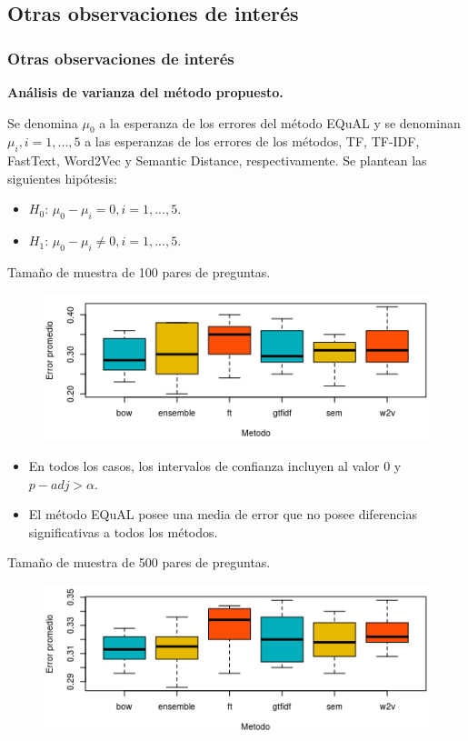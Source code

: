 \subsection{Otras observaciones de interés}
\begin{frame}
	\frametitle{Otras observaciones de interés}
	\textbf{Análisis de varianza del método propuesto.}

	Se denomina \(\mu_0\) a la esperanza de los errores del método EQuAL y se denominan \(\mu_i, i = 1,..., 5\) a las esperanzas de los errores de los métodos, TF, TF-IDF, FastText, Word2Vec y Semantic Distance, respectivamente. Se plantean las siguientes hipótesis:
	\bigskip
	\begin{itemize}
		\item \textbf{\(H_0\)}: \(\mu_0 - \mu_i = 0, i = 1,..., 5\).
		\item \textbf{\(H_1\)}: \(\mu_0 - \mu_i \neq 0, i = 1,..., 5\).
	\end{itemize}

	\framebreak

	\footnotesize
	Tamaño de muestra de 100 pares de preguntas.
	\begin{figure}[!htbp]
		\centering
		\includegraphics[width=0.7\linewidth]{../10_resultados/imagenes/anova_100}
		\label{fig:anova100-1}
	\end{figure}

	\begin{itemize}
		\item En todos los casos, los intervalos de confianza incluyen al valor 0 y \(p{-}adj > \alpha\).
		\item El método EQuAL posee una media de error que no posee diferencias significativas a todos los métodos.
	\end{itemize}

	\framebreak

	Tamaño de muestra de 500 pares de preguntas.
	\begin{figure}[!htbp]
		\centering
		\includegraphics[width=0.7\linewidth]{../10_resultados/imagenes/anova_500}
		\label{fig:anova500-1}
	\end{figure}


\end{frame}
